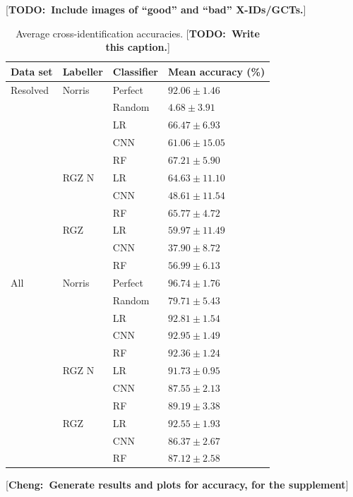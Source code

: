 \documentclass[fleqn,usenatbib,usedcolumn]{mnras}
\newcommand{\cheng}[1]{ {\color{teal}[{\bf Cheng:~{#1}}]} }
\newcommand{\todo}[1]{ {\color{red}[{\bf TODO:~{#1}}]} }
\begin{document}
  \todo{Include images of ``good'' and ``bad'' X-IDs/GCTs.}

  \begin{table}
    \caption{Average cross-identification accuracies. \todo{Write this caption.}}
    \label{tab:cross-id-accuracies}
    \begin{tabular}{lll|l}
      \hline
      Data set & Labeller & Classifier & Mean accuracy (\%)\\
      \hline
      Resolved & Norris & Perfect & $92.06 \pm 1.46$\\
       &  & Random & $4.68 \pm 3.91$\\
       &  & LR & $66.47 \pm 6.93$\\
       &  & CNN & $61.06 \pm 15.05$\\
       &  & RF & $67.21 \pm 5.90$\\
       & RGZ N & LR & $64.63 \pm 11.10$\\
       &  & CNN & $48.61 \pm 11.54$\\
       &  & RF & $65.77 \pm 4.72$\\
       & RGZ & LR & $59.97 \pm 11.49$\\
       &  & CNN & $37.90 \pm 8.72$\\
       &  & RF & $56.99 \pm 6.13$\\
      All & Norris & Perfect & $96.74 \pm 1.76$\\
       &  & Random & $79.71 \pm 5.43$\\
       &  & LR & $92.81 \pm 1.54$\\
       &  & CNN & $92.95 \pm 1.49$\\
       &  & RF & $92.36 \pm 1.24$\\
       & RGZ N & LR & $91.73 \pm 0.95$\\
       &  & CNN & $87.55 \pm 2.13$\\
       &  & RF & $89.19 \pm 3.38$\\
       & RGZ & LR & $92.55 \pm 1.93$\\
       &  & CNN & $86.37 \pm 2.67$\\
       &  & RF & $87.12 \pm 2.58$\\
      \hline
    \end{tabular}
  \end{table}

  \cheng{Generate results and plots for accuracy, for the supplement}
\end{document}
